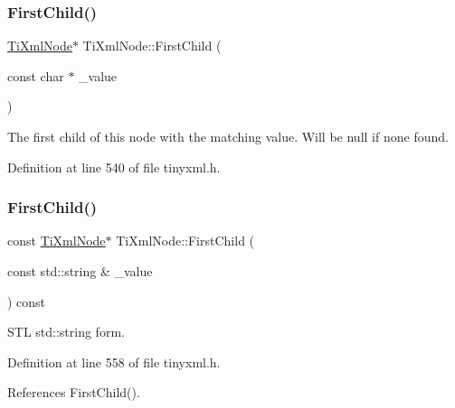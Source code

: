 \subsubsection{\texorpdfstring{First\+Child()}{FirstChild()}\hspace{0.1cm}{\footnotesize\ttfamily [4/6]}}
{\footnotesize\ttfamily \hyperlink{class_ti_xml_node}{Ti\+Xml\+Node}$\ast$ Ti\+Xml\+Node\+::\+First\+Child (\begin{DoxyParamCaption}\item[{const char $\ast$}]{\+\_\+value }\end{DoxyParamCaption})\hspace{0.3cm}{\ttfamily [inline]}}



The first child of this node with the matching \textquotesingle{}value\textquotesingle{}. Will be null if none found. 



Definition at line 540 of file tinyxml.\+h.

\hypertarget{class_ti_xml_node_ab7f52e96c41fca07e81521b5f5ea35b9}{}\label{class_ti_xml_node_ab7f52e96c41fca07e81521b5f5ea35b9} 
\subsubsection{\texorpdfstring{First\+Child()}{FirstChild()}\hspace{0.1cm}{\footnotesize\ttfamily [5/6]}}
{\footnotesize\ttfamily const \hyperlink{class_ti_xml_node}{Ti\+Xml\+Node}$\ast$ Ti\+Xml\+Node\+::\+First\+Child (\begin{DoxyParamCaption}\item[{const std\+::string \&}]{\+\_\+value }\end{DoxyParamCaption}) const\hspace{0.3cm}{\ttfamily [inline]}}



S\+TL std\+::string form. 



Definition at line 558 of file tinyxml.\+h.



References First\+Child().

\hypertarget{class_ti_xml_node_a10d2669ccb5e29e02fcb0e4408685ef6}{}\label{class_ti_xml_node_a10d2669ccb5e29e02fcb0e4408685ef6} 
